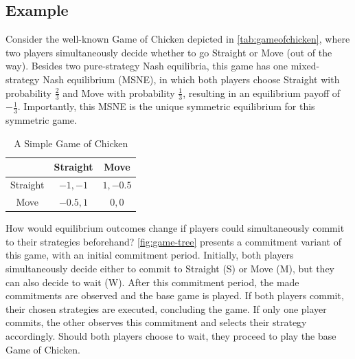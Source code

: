 \documentclass[../paper.tex]{subfiles}
\begin{document}
\subsection*{\centering Example}
Consider the well-known Game of Chicken depicted in \autoref{tab:gameofchicken}, where two players simultaneously decide whether to go Straight or Move (out of the way). Besides two pure-strategy Nash equilibria, this game has one mixed-strategy Nash equilibrium (MSNE), in which both players choose Straight with probability $\frac{2}{3}$ and Move with probability $\frac{1}{3}$, resulting in an equilibrium payoff of $-\frac{1}{3}$. Importantly, this MSNE is the unique symmetric equilibrium for this symmetric game.
\begin{table}[h!]
\centering
\begin{tabular}{c|cc}
    & Straight & Move \\[0.2em]
    \hline
    Straight & $-1,-1$ & $1,-0.5$ \\[0.2em]
    Move & $-0.5,1$ & $0,0$ \\[0.2em]
\end{tabular}
\caption{A Simple Game of Chicken}
\label{tab:gameofchicken}
\end{table}
\newline
How would equilibrium outcomes change if players could simultaneously commit to their strategies beforehand? \autoref{fig:game-tree} presents a commitment variant of this game, with an initial commitment period.  Initially, both players simultaneously decide either to commit to Straight (S) or Move (M), but they can also decide to wait (W). After this commitment period, the made commitments are observed and the base game is played. If both players commit, their chosen strategies are executed, concluding the game. If only one player commits, the other observes this commitment and selects their strategy accordingly. Should both players choose to wait, they proceed to play the base Game of Chicken.
\end{document}
